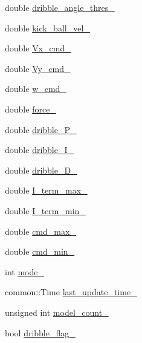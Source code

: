 \begin{DoxyCompactItemize}
\item 
double \hyperlink{classgazebo_1_1NubotGazebo_ab012e0229172416640558cf2746a0974}{dribble\-\_\-angle\-\_\-thres\-\_\-}
\item 
double \hyperlink{classgazebo_1_1NubotGazebo_abc8f7cb67014e700c08e27023353e419}{kick\-\_\-ball\-\_\-vel\-\_\-}
\item 
double \hyperlink{classgazebo_1_1NubotGazebo_af17747304ff9b241fa0642c52923498b}{Vx\-\_\-cmd\-\_\-}
\item 
double \hyperlink{classgazebo_1_1NubotGazebo_a977c91e62fed23c5fb9233e5d38ad597}{Vy\-\_\-cmd\-\_\-}
\item 
double \hyperlink{classgazebo_1_1NubotGazebo_aebc0851c9ab6da1d1c96d470e72758f8}{w\-\_\-cmd\-\_\-}
\item 
double \hyperlink{classgazebo_1_1NubotGazebo_a7ebd21f6da11a8f2b514c2e0930a26e6}{force\-\_\-}
\item 
double \hyperlink{classgazebo_1_1NubotGazebo_a9e30363181d0a790081ce6d0e9151e6b}{dribble\-\_\-\-P\-\_\-}
\item 
double \hyperlink{classgazebo_1_1NubotGazebo_ab74f3e63fe906f0c982837b1eeeefb5c}{dribble\-\_\-\-I\-\_\-}
\item 
double \hyperlink{classgazebo_1_1NubotGazebo_a727079312e073df8799e1a385ac8da00}{dribble\-\_\-\-D\-\_\-}
\item 
double \hyperlink{classgazebo_1_1NubotGazebo_a0f8a50e34877912a0c53c3185ccd28d9}{I\-\_\-term\-\_\-max\-\_\-}
\item 
double \hyperlink{classgazebo_1_1NubotGazebo_affe0d982594c738a7ebec3ac1849c01f}{I\-\_\-term\-\_\-min\-\_\-}
\item 
double \hyperlink{classgazebo_1_1NubotGazebo_a6b6ab10ac24ec1483797885f5d1b9110}{cmd\-\_\-max\-\_\-}
\item 
double \hyperlink{classgazebo_1_1NubotGazebo_a360cbab192432814122197f21d685e56}{cmd\-\_\-min\-\_\-}
\item 
int \hyperlink{classgazebo_1_1NubotGazebo_a3c54a29f7aa4e67e4f86b5e848a930d5}{mode\-\_\-}
\item 
common\-::\-Time \hyperlink{classgazebo_1_1NubotGazebo_a1aeb8fee9f7e057b182afcf2fd03f1c1}{last\-\_\-update\-\_\-time\-\_\-}
\item 
unsigned int \hyperlink{classgazebo_1_1NubotGazebo_aefc2d91922066c5ffc1d7faa175ab68a}{model\-\_\-count\-\_\-}
\item 
bool \hyperlink{classgazebo_1_1NubotGazebo_a408738f621515f00547b54ed74481127}{dribble\-\_\-flag\-\_\-}
\item 

\end{DoxyCompactItemize}
